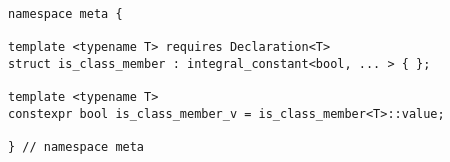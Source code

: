 
\begin{verbatim}
namespace meta {

template <typename T> requires Declaration<T>
struct is_class_member : integral_constant<bool, ... > { };

template <typename T>
constexpr bool is_class_member_v = is_class_member<T>::value;

} // namespace meta
\end{verbatim}
